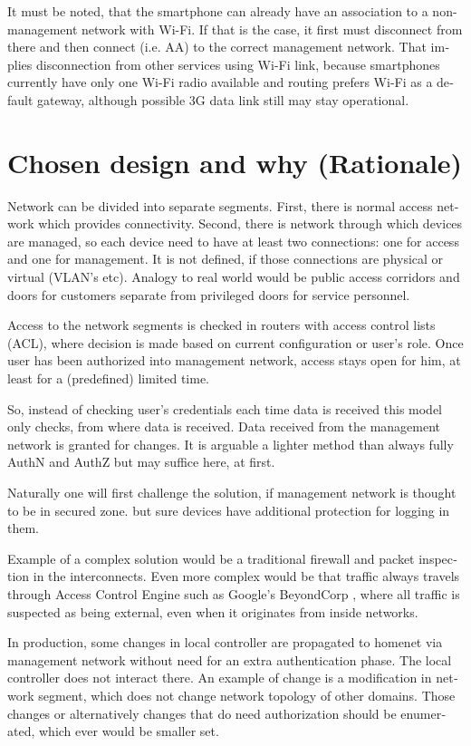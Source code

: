 \documentclass[12pt,a4paper,english]{tutthesis}
\begin{document}
\begin{otherlanguage}{english}
It must be noted, that the smartphone can already have an association
to a non-management network with Wi-Fi. If that is the case, it first
must disconnect from there and then connect (i.e. AA) to the correct management
network. That implies disconnection from other services using Wi-Fi
link, because smartphones currently have only one Wi-Fi radio
available and routing prefers Wi-Fi as a default gateway, although
possible 3G data link still may stay operational.


\section{Chosen design and why (Rationale)}
\label{sec-4-3}
\label{sec:chosendesign}   
Network can be divided into separate segments. 
First, there is normal access network which provides
connectivity. Second, there is network through which devices are
managed, so each device need to have at least two connections: one for
access and one for management. It is not defined, if those connections
are physical or virtual (VLAN's etc). 
Analogy to real world would be public access corridors and doors for
customers separate from privileged doors for service personnel.

Access to the network segments is checked in routers with access control lists
(ACL), where decision is made based on current configuration or user's
role.  Once user has been authorized into management network, access
stays open for him, at least for a (predefined) limited time.

So, instead of checking user's credentials each time data is received
this model only checks, from where data is received. 
Data received from the management network is granted for changes.
It is arguable a lighter method than always
fully AuthN and AuthZ but may suffice here, at first.

Naturally one will first challenge the solution, if
management network is thought to be in secured zone.
but sure devices have additional protection for logging in them. 


Example of a complex solution would be a traditional firewall and packet
inspection in the interconnects. Even more complex would be that traffic
always travels through Access Control Engine such as Google's
BeyondCorp \cite{2014-beyondcorp}, where all
traffic is suspected as being external, even when it originates from inside networks.


In production, some changes in local controller are propagated to homenet
via management network without need for an extra authentication phase.
The local controller does not interact there. An example of change is
a modification in network segment, which does not change network topology of other domains.
Those changes or alternatively changes that do need authorization
should be enumerated, which ever would be smaller set.  


\end{otherlanguage}
\end{document}
